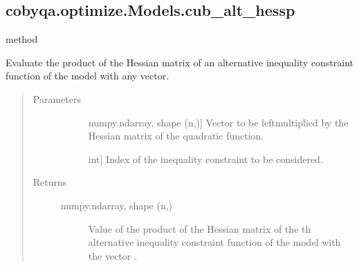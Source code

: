 \documentclass[letterpaper,10pt,english]{sphinxmanual}
\begin{document}
\begin{fulllineitems}
\subsection{cobyqa.optimize.Models.cub\_alt\_hessp}
\label{\detokenize{refs/generated/cobyqa.optimize.Models.cub_alt_hessp:cobyqa-optimize-models-cub-alt-hessp}}\label{\detokenize{refs/generated/cobyqa.optimize.Models.cub_alt_hessp::doc}}
\sphinxAtStartPar
method

\begin{fulllineitems}
\label{\detokenize{refs/generated/cobyqa.optimize.Models.cub_alt_hessp:cobyqa.optimize.Models.cub_alt_hessp}}
\sphinxAtStartPar
Evaluate the product of the Hessian matrix of an alternative inequality
constraint function of the model with any vector.
\begin{quote}\begin{description}
\item[{Parameters}] \leavevmode\begin{description}
\item[{}] \leavevmode{[}numpy.ndarray, shape (n,){]}
\sphinxAtStartPar
Vector to be left\sphinxhyphen{}multiplied by the Hessian matrix of the quadratic
function.

\item[{}] \leavevmode{[}int{]}
\sphinxAtStartPar
Index of the inequality constraint to be considered.

\end{description}

\item[{Returns}] \leavevmode\begin{description}
\item[{numpy.ndarray, shape (n,)}] \leavevmode
\sphinxAtStartPar
Value of the product of the Hessian matrix of the \sphinxhyphen{}th alternative
inequality constraint function of the model with the vector .

\end{description}

\end{description}\end{quote}


\end{fulllineitems}
\end{fulllineitems}
\end{document}
